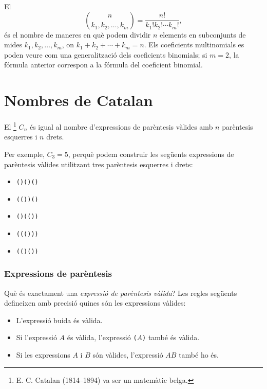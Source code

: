 
El 
\[ {n \choose k_1,k_2,\ldots,k_m} = \frac{n!}{k_1! k_2! \cdots k_m!}, \]
és el nombre de maneres en què podem dividir $n$ elements en
subconjunts de mides $k_1,k_2,\ldots,k_m$, on
$k_1+k_2+\cdots+k_m=n$. Els coeficients multinomials es poden veure
com una generalització dels coeficients binomials; si $m=2$, la
fórmula anterior correspon a la fórmula del coeficient binomial.

\section{Nombres de Catalan}


El \footnote{E. C. Catalan (1814--1894) va ser
un matemàtic belga.} $C_n$ és igual al nombre d'expressions de
parèntesis vàlides amb $n$ parèntesis esquerres i $n$ drets.

Per exemple, $C_3=5$, perquè podem construir les següents expressions
de parèntesis vàlides utilitzant tres parèntesis esquerres i drets:


\begin{itemize}[noitemsep]
\item \texttt{()()()}
\item \texttt{(())()}
\item \texttt{()(())}
\item \texttt{((()))}
\item \texttt{(()())}
\end{itemize}


\subsubsection{Expressions de parèntesis}


Què és exactament una \emph{expressió de parèntesis vàlida}? Les
regles següents defineixen amb precisió quines són les expressions
vàlides:


\begin{itemize}
\item L'expressió buida és vàlida.
\item Si l'expressió $A$ és vàlida,
l'expressió
\texttt{(}$A$\texttt{)} també és vàlida.
\item Si les expressions $A$ i $B$ són vàlides,
l'expressió $AB$ també ho és.
\end{itemize}



